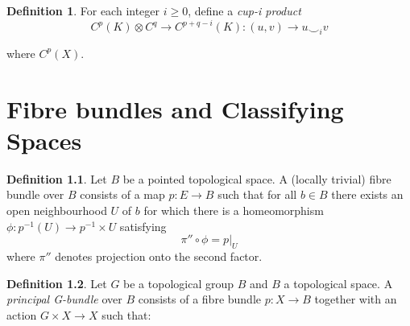\documentclass[A4,12pt,oneside]{book}
\theoremstyle{definition}
\newtheorem{defi}{Definition}
\begin{document}
\begin{defi}
For each integer $i\geq 0$, define a \emph{cup-i product}
\begin{equation*}
C^p(K)\otimes C^q\rightarrow C^{p+q-i}(K):(u,v)\rightarrow u\smile_i v
\end{equation*}
\end{defi}
 where $C^p(X)$.

\chapter{Fibre bundles and Classifying Spaces}

\begin{defi}
Let $B$ be a pointed topological space. A (locally trivial) fibre bundle over $B$ consists of a map $p:E\rightarrow B$ such that for all $b\in B$ there exists an open neighbourhood $U$ of $b$ for which there is a homeomorphism $\phi:p^{-1}(U)\rightarrow p^{-1}\times U$ satisfying 
\begin{equation*}
\pi''\circ\phi=p\bigl |_U
\end{equation*}
where $\pi''$ denotes projection onto the second factor. 
\end{defi}

\begin{defi}
Let $G$ be a topological group $B$ and $B$ a topological space. A \emph{principal G-bundle} over $B$ consists of a fibre bundle $p:X\rightarrow B$ together with an action $G\times X\rightarrow X$ such that:
\end{defi}
\end{document}
